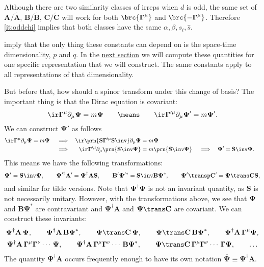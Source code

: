 \documentclass[11pt]{article}
\newcommand{\Gammab}{\boldsymbol{\Gamma}}
\renewcommand{\S}{\mathbf{S}}
\newcommand{\A}{\mathbf{A}}
\newcommand{\B}{\mathbf{B}}
\renewcommand{\C}{\mathbf{C}}
\newcommand{\At}{\widetilde{\A}}
\newcommand{\Bt}{\widetilde{\B}}
\newcommand{\Ct}{\widetilde{\C}}
\newcommand{\Psib}{\boldsymbol{\Psi}}
\begin{document}
Although there are two similarity classes of irreps when $d$ is odd, the same set of $\A/\At$, $\B/\Bt$, $\C/\Ct$ will work for both $\brc{\Gammab^\mu}$ and $\brc{ -\Gammab^\mu }$.
Therefore \cref{it:oddchi} implies that both classes have the same $\alpha, \beta, s_i, \hat{s}$.

 imply that the only thing these constants can depend on is the space-time dimensionality, $p$ and $q$.
In the \hyperref[sec:explicit]{next section} we will compute these quantities for one specific representation that we will construct.
The same constants apply to all representations of that dimensionality.

But before that, how should a spinor transform under this change of basis?
The important thing is that the Dirac equation is covariant:
%
\begin{equation*}
  \ir \Gammab^\mu \partial_\mu \Psib = m \Psib
  \qquad \means \qquad
  \ir \Gammab'^\mu \partial_\mu \Psib' = m \Psib'.
\end{equation*}
%
We can construct $\Psib'$ as follows
%
\begin{equation*}
\begin{aligned}
  \ir \Gammab^\mu \partial_\mu \Psib &= m \Psib &
  &\implies &
  \ir \prn{\S \Gammab'^\mu \S\inv} \partial_\mu \Psib &= m \Psib \\ &&
  &\implies &
  \ir \Gammab'^\mu \partial_\mu \prn{\S\inv\Psib} &= m \prn{\S\inv\Psib} &
  &\implies &
  \Psib' &= \S\inv \Psib.
\end{aligned}
\end{equation*}
%
This means we have the following transformations:
%
\begin{equation}\label{eq:spinorbasis}
  \Psib' = \S\inv \Psib, \qquad
  \Psib'^\dag \A' = \Psib^\dag \A \S, \qquad
  \B' \Psib'^\ast = \S\inv \B \Psib^\ast, \qquad
  \Psib'\transp \C' = \Psib\trans \C \S,
\end{equation}
%
and similar for tilde versions.
Note that $\Psib^\dag \Psib$ is not an invariant quantity, as \(\S\) is not necessarily unitary.
However, with the transformations above, we see that $\Psib$ and $\B \Psib^\ast$ are contravariant and $\Psib^\dag\A$ and $\Psib\trans \C$ are covariant.
We can construct these invariants:
%
\begin{equation}\label{eq:spinorinvt}
\begin{gathered}
  \Psib^\dag \A\, \Psib, \qquad
  \Psib^\dag \A\, \B \Psib^\ast, \qquad
  \Psib\trans \C\, \Psib, \qquad
  \Psib\trans \C\, \B \Psib^\ast, \qquad
  \Psib^\dag \A\, \Gammab^\mu \Psib, \\
  \Psib^\dag \A\, \Gammab^\mu \Gammab^\nu \cdots\, \Psib, \qquad
  \Psib^\dag \A\, \Gammab^\mu \Gammab^\nu \cdots\, \B \Psib^\ast, \qquad
  \Psib\trans \C\, \Gammab^\mu \Gammab^\nu \cdots\, \Gammab \Psib, \qquad
  \ldots
\end{gathered}
\end{equation}
%
The quantity \( \Psib^\dag \A \) occurs frequently enough to have its own notation \( \overline{\Psib} \equiv \Psib^\dag \A \).
\end{document}
